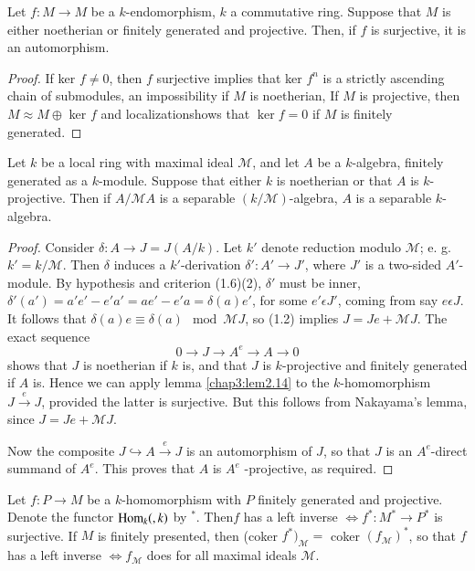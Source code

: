\setcounter{lemma}{13}
\begin{lemma}\label{chap3:lem2.14} %
Let $f: M \to M$ be a $k$-endomorphism, $k$ a commutative
ring. Suppose that $M$ is either noetherian or finitely generated and
projective. Then, if $f$ is surjective, it is an automorphism. 
\end{lemma}

\begin{proof}%
If ker $f \neq 0$, then $f$ surjective implies that ker $f^n$ is a
strictly ascending chain of submodules, an impossibility if $M$ is
noetherian, If $M$ is projective, then $ M \approx M \oplus$ ker $f$
and localization\pageoriginale shows that $\ker f =0$ if $M$ is
finitely generated.  
\end{proof}

\setcounter{prop}{14}
\begin{prop}\label{chap3:prop2.15} %
Let  $k$ be a local ring with maximal ideal $\mathscr{M}$, and let $A$
be a $k$-algebra, finitely generated as  a $k$-module. Suppose that
either $k$ is noetherian or that $A$ is $k$-projective. Then if  $A/
\mathscr{M} A$ is a separable $(k / \mathscr{M})$-algebra, $A$ is a
separable $k$-algebra. 
\end{prop}

\begin{proof}%
Consider $\delta : A \to J = J(A/k)$. Let $k'$ denote reduction modulo
$\mathscr{M}$; e. g. $k' = k / \mathscr{M}$. Then $\delta$ induces a
$k'$-derivation $\delta': A' \to J'$, where $J'$ is a two-sided
$A'$-module. By hypothesis and criterion (1.6)(2), $\delta'$ must be
inner, $\delta' (a') = a' e' - e'a' = ae' - e' a = \delta (a) e'$, for
some $e' \epsilon J'$, coming from say $e \epsilon J$. 
It follows that $\delta (a) e \equiv \delta (a) \mod \mathscr{M} J$,
so (1.2) implies $J =  Je + \mathscr{M} J$. The exact sequence  
$$
0 \to J \to A^e \to A \to 0
$$ 
shows that $J$ is noetherian if $k$ is, and that $J$ is $k$-projective
and finitely generated if $A$ is. Hence we can apply lemma
\ref{chap3:lem2.14} to the 
$k$-homomor\-phism $J \xrightarrow{e} J$, provided the latter is
surjective. But this follows from Nakayama's lemma, since $J = Je +
\mathscr{M} J$. 

Now the composite $J \hookrightarrow A \xrightarrow{e} J$ is an
automorphism of $J$, so that $J$ is an $A^e$-direct summand of
$A^e$. This proves that $A$ is $A^e$ -projective, as required. 
\end{proof}

\setcounter{lemma}{15}
\begin{lemma} %
Let $f: P \to M$ be a $k$-homomorphism with $P$ finitely  generated
and projective. Denote the functor $\operatorname{Hom}_k ( ,k)$ by
$^*$. Then\pageoriginale $f$ has a left inverse $\Leftrightarrow f^*:
M^* \to P^*$ is surjective. If 
$M$ is finitely presented, then (coker $f^*)_\mathscr{M} = $ coker
$(f_{\mathscr{M}})^*$, so that $f$ has a left inverse $\Leftrightarrow
f_{\mathscr{M}}$ does for all maximal ideals $\mathscr{M}$.  
  \end{lemma}  

